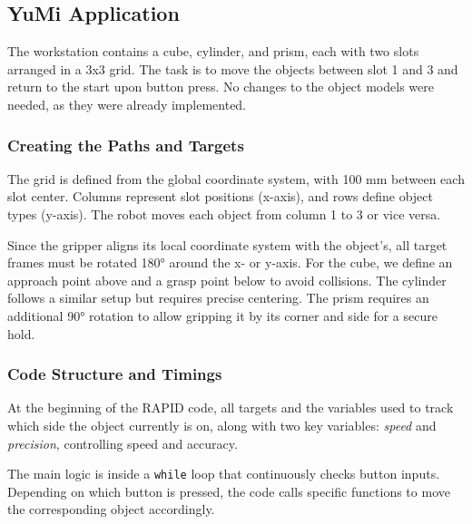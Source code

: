 \documentclass[a4paper,12pt]{article}
\begin{document}
\subsection{YuMi Application}
The workstation contains a cube, cylinder, and prism, each with two slots arranged in a 3x3 grid. The task is to move the objects between slot 1 and 3 and return to the start upon button press. No changes to the object models were needed, as they were already implemented.

\subsubsection{Creating the Paths and Targets}
The grid is defined from the global coordinate system, with 100 mm between each slot center. Columns represent slot positions (x-axis), and rows define object types (y-axis). The robot moves each object from column 1 to 3 or vice versa.

Since the gripper aligns its local coordinate system with the object's, all target frames must be rotated 180° around the x- or y-axis. For the cube, we define an approach point above and a grasp point below to avoid collisions. The cylinder follows a similar setup but requires precise centering. The prism requires an additional 90° rotation to allow gripping it by its corner and side for a secure hold.


\subsubsection{Code Structure and Timings}
At the beginning of the RAPID code, all targets and the variables used to track which side the object currently is on, along with two key variables: \textit{speed} and \textit{precision}, controlling speed and accuracy.

The main logic is inside a \texttt{while} loop that continuously checks button inputs. Depending on which button is pressed, the code calls specific functions to move the corresponding object accordingly.

\end{document}
